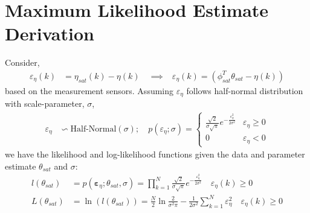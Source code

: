 \documentclass[subscriptcorrection,upint,varvw,barcolor=Goldenrod3,mathalfa=cal=euler,balance,hyphenate,french,pdf-a]{asmejour}
\newcommand{\lr}[1]{\left( #1 \right)}
\begin{document}
\appendix   %
% 
\section{Maximum Likelihood Estimate Derivation \label{sec::mle_derivation}}
Consider,
\begin{align}
        \varepsilon_\eta(k) & = \eta_{sat}(k) - \eta\lr{k}  \quad
        \implies            & \varepsilon_\eta(k) = \lr{\phi_{sat}^T \theta_{sat} - \eta \lr{k}} \label{eqn::eta_regression}
\end{align}
based on the measurement sensors. Assuming $\varepsilon_\eta$ follows half-normal distribution \cite{byers2014half} with scale-parameter, $\sigma$,
\begin{align}
        \varepsilon_\eta & \backsim \text{Half-Normal}(\sigma);\quad
        p(\varepsilon_\eta;\sigma) = \begin{cases} \frac{\sqrt{2}}{\sigma \sqrt{\pi}} e^{- \frac{\varepsilon_\eta^2}{2 \sigma^2}} & \varepsilon_\eta \geq  0 \\
              0                                                                              & \varepsilon_{\eta} < 0
                                     \end{cases}
        \label{eqn::exp_pdf}
\end{align}
we have the likelihood and log-likelihood functions given the data and parameter estimate $\theta_{sat}$ and $\sigma$:
\begin{align}
        l\lr{\theta_{sat}} & =p(\pmb \varepsilon_{\eta};\theta_{sat}, \sigma) = \prod_{k=1}^N  \frac{\sqrt{2}}{\sigma \sqrt{\pi}} e^{- \frac{\varepsilon_\eta^2}{2 \sigma^2}} \quad \varepsilon_\eta(k) \geq  0
        \label{eqn::likelihood}                                                                                                                                                                                 \\
        L\lr{\theta_{sat}} & =\ln \lr{l(\theta_{sat})} = \frac{N}{2} \ln \frac{2}{\sigma^2 \pi} - \frac{1}{2 \sigma^2} {\sum_{k=1}^N \varepsilon_\eta^2}
        \quad \varepsilon_\eta(k) \geq  0
        \label{eqn::log_likelihood}
\end{align}
\end{document}
